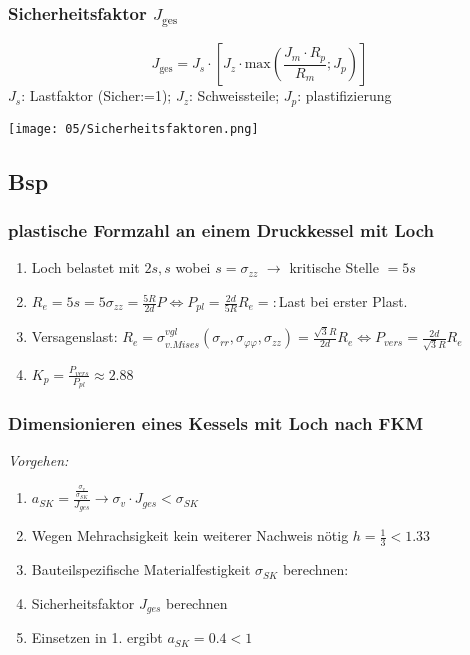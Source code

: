         \subsubsection{Sicherheitsfaktor $J_{\textrm{ges}}$}
        \small\[J_{\textrm{ges}}= J_s \cdot \left[ J_z \cdot \textrm{max}\left(\frac{J_m \cdot R_p}{R_m}; J_p \right) \right] \]\normalsize
        $J_s$: Lastfaktor (Sicher:=1); $J_z$: Schweissteile; $J_p$: plastifizierung
        \begin{center}
            \texttt{[image: 05/Sicherheitsfaktoren.png]}
        \end{center}
    
    \subsection{Bsp}
        \subsubsection{plastische Formzahl an einem Druckkessel mit Loch}
            \begin{enumerate}
                \item Loch belastet mit $2s,s$ wobei $s=\sigma_{zz}$ $\rightarrow$ kritische Stelle $=5s$
                \item $R_e=5s=5\sigma_{zz}=\frac{5R}{2d}P \Leftrightarrow P_{pl}=\frac{2d}{5R}R_e=:$Last bei erster Plast.
                \item Versagenslast: $R_e=\sigma_{v.Mises}^{vgl}(\sigma_{rr},\sigma_{\varphi\varphi},\sigma_{zz})=\frac{\sqrt{3}R}{2d}R_e \Leftrightarrow P_{vers}=\frac{2d}{\sqrt{3}R}R_e$
                \item $K_p=\frac{P_{vers}}{P_{pl}}\approx 2.88$
            \end{enumerate}
            
        \subsubsection{Dimensionieren eines Kessels mit Loch nach FKM}
        \textit{Vorgehen:}
        \begin{enumerate}
            \item $ a_{{SK}} = \frac{\frac{\sigma_v}{\sigma_{{SK}}}}{J_{ges}}  \rightarrow  \sigma_v \cdot J_{ges} < \sigma_{{SK}} $
            \item Wegen Mehrachsigkeit kein weiterer Nachweis nötig
            $ h = \frac{1}{3} < 1.33$ 
            \item Bauteilspezifische Materialfestigkeit $ \sigma_{SK} $ berechnen:
            \item Sicherheitsfaktor $J_{ges}$ berechnen
            \item Einsetzen in 1. ergibt $a_{SK}=0.4<1$
        \end{enumerate}
        
        
        
        
        
        
        
